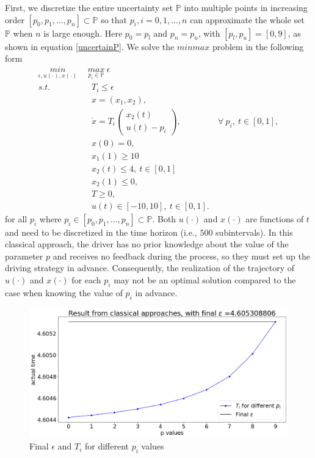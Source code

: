 \documentclass  [
  paper    = a4,
  BCOR     = 10mm,
  twoside,
  fontsize = 12pt,
  fleqn,
  toc      = bibnumbered,
  toc      = listofnumbered,
  numbers  = noendperiod,
  headings = normal,
  listof   = leveldown,
  version  = 3.03
]                                       {scrreprt}
\newcommand{\<}{\langle}
\renewcommand{\>}{\rangle}
\begin{document}
First, we discretize the entire uncertainty set $\mathbb{P}$ into multiple points in increasing order $[p_0, p_1, \dots, p_n] \subset \mathbb{P}$ so that $p_i, i=0, 1, \dots, n$ can approximate the whole set $\mathbb{P}$ when $n$ is large enough. Here $p_0=p_l$ and $p_n=p_u$, with $[p_l, p_u]=[0,9]$, as shown in equation \ref{uncertainP}. We solve the $minmax$ problem in the following form
\begin{subequations}
	\begin{align}
		\underset{\epsilon, u(\cdot), x(\cdot)}{min}  \ \   &  \underset{p_i \in \mathbb{P}}{max}  \  \epsilon \\ 
		s.t.  &  \ \ T_i  \leq \epsilon \\
		&  \ \ x = (x_1, x_2),   \label{ca_rc_x} \\ 
		& \ \  \dot{x} = T_i  \begin{pmatrix}  x_2(t) \\ u(t)-p_i   \end{pmatrix}, &  \ \forall \   p_i, \  t \in [0,1],  \label{ca_rc_partial} \\
		& \ \ x(0) = 0, \label{ca_rc_t0}\\
		& \ \ x_1(1) \geq 10  \   \label{ca_rc_x1_t1} \\
		& \ \ x_2(t) \leq 4,  \    t \in [0,1] \label{ca_rc_x2_tc} \\
		& \ \ x_2(1) \leq 0,   \label{ca_rc_x2_t1}  \\
		& \ \ T \geq 0, \\
		& \ \ u(t) \in [-10, 10],  \ t \in [0,1]. 
	\end{align}
	\label{ca_rc}
\end{subequations}
for all $p_i$ where $p_i \in [p_0, p_1, ..., p_n] \subset \mathbb{P}$. Both $u(\cdot)$ and $x(\cdot)$ are functions of $t$ and need to be discretized in the time horizon (i.e., $500$ subintervals). In this classical approach, the driver has no prior knowledge about the value of the parameter $p$ and receives no feedback during the process, so they must set up the driving strategy in advance. Consequently, the realization of the trajectory of $u(\cdot)$ and $x(\cdot)$ for each $p_i$ may not be an optimal solution compared to the case when knowing the value of $p_i$ in advance.

\begin{figure}[H]
	\centerline{\includegraphics[width=13cm]{ca_result.png}}
	\caption{Final $\epsilon$ and $T_i$ for different $p_i$ values}
	\label{fig_ca_result}
\end{figure}
\end{document}
